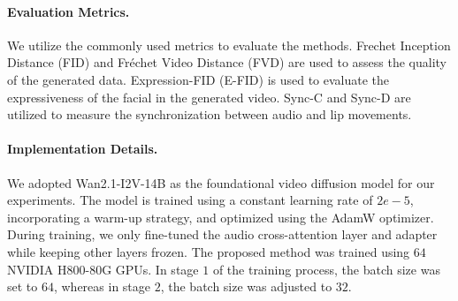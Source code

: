 \documentclass{article}
\begin{document}
\paragraph{Evaluation Metrics.} 
We utilize the commonly used metrics to evaluate the methods. Frechet Inception Distance (FID) \cite{heusel2017gans} and Fréchet Video Distance (FVD) \cite{unterthiner2019fvd} are used to assess the quality of the generated data.  Expression-FID (E-FID) is used to evaluate the expressiveness of the facial in the generated video.  Sync-C \cite{chung2017out} and Sync-D \cite{chung2017out} are utilized to measure the synchronization between audio and lip movements. 

\paragraph{Implementation Details.} 
We adopted Wan2.1-I2V-14B as the foundational video diffusion model for our experiments. The model is trained using a constant learning rate of $2e-5$, incorporating a warm-up strategy, and optimized using the AdamW optimizer.
During training, we only fine-tuned the audio cross-attention layer and adapter while keeping other layers frozen. 
The proposed method was trained using $64$ NVIDIA H800-80G GPUs. In stage $1$ of the training process, the batch size was set to $64$, whereas in stage $2$, the batch size was adjusted to $32$.
\end{document}
